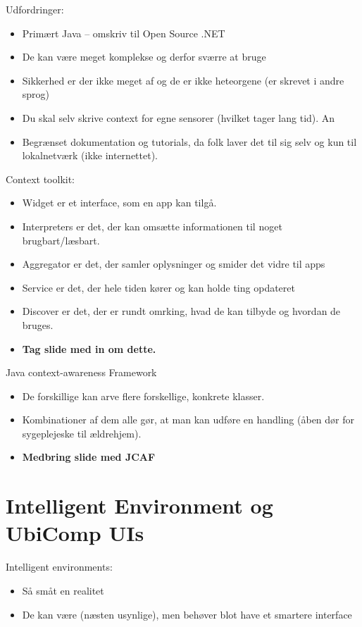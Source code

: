 \documentclass[oneside, 10pt]{article}
\begin{document}
Udfordringer:
\begin{itemize}
	\item Primært Java -- omskriv til Open Source .NET 
	\item De kan være meget komplekse og derfor sværre at bruge
	\item Sikkerhed er der ikke meget af og de er ikke heteorgene (er skrevet i andre sprog)
	\item Du skal selv skrive context for egne sensorer (hvilket tager lang tid). An
	\item Begrænset dokumentation og tutorials, da folk laver det til sig selv og kun til lokalnetværk (ikke internettet).
\end{itemize}

Context toolkit:
\begin{itemize}
	\item Widget er et interface, som en app kan tilgå.
	\item Interpreters er det, der kan omsætte informationen til noget brugbart/læsbart.
	\item Aggregator er det, der samler oplysninger og smider det vidre til apps
	\item Service er det, der hele tiden kører og kan holde ting opdateret
	\item Discover er det, der er rundt omrking, hvad de kan tilbyde og hvordan de bruges.
	\item \textbf{Tag slide med in om dette.}
\end{itemize}

Java context-awareness Framework
\begin{itemize}
	\item De forskillige  kan arve flere forskellige, konkrete klasser.
	\item Kombinationer af dem alle gør, at man kan udføre en handling (åben dør for sygeplejeske til ældrehjem).
	\item \textbf{Medbring slide med JCAF}
\end{itemize}





\newpage
\section{Intelligent Environment og UbiComp UIs}

Intelligent environments:
\begin{itemize}
	\item Så småt en realitet
	\item De kan være (næsten usynlige), men behøver blot have et smartere interface
\end{itemize}
\end{document}
